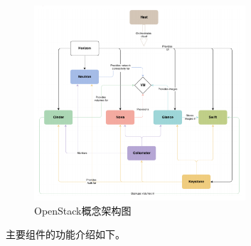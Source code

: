 \begin{figure}[!htb]
  \centering
  \includegraphics[width=0.7\textwidth]{logo/openstack.png}
  \caption{OpenStack概念架构图}
  \label{fig:openstack}
\end{figure}

主要组件的功能介绍如下\cite{OpenStack-3}。

